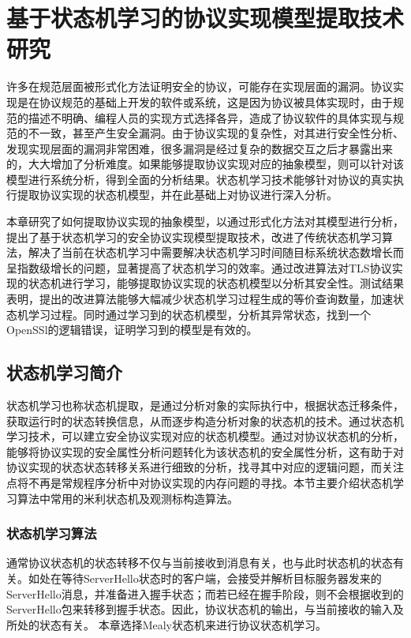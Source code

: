 \chapter{基于状态机学习的协议实现模型提取技术研究}
\label{chap-statemachine}
许多在规范层面被形式化方法证明安全的协议，可能存在实现层面的漏洞。协议实现是在协议规范的基础上开发的软件或系统，这是因为协议被具体实现时，由于规范的描述不明确、编程人员的实现方式选择各异，造成了协议软件的具体实现与规范的不一致，甚至产生安全漏洞。由于协议实现的复杂性，对其进行安全性分析、发现实现层面的漏洞非常困难，很多漏洞是经过复杂的数据交互之后才暴露出来的，大大增加了分析难度。如果能够提取协议实现对应的抽象模型，则可以针对该模型进行系统分析，得到全面的分析结果。状态机学习技术能够针对协议的真实执行提取协议实现的状态机模型，并在此基础上对协议进行深入分析。

本章研究了如何提取协议实现的抽象模型，以通过形式化方法对其模型进行分析，提出了基于状态机学习的安全协议实现模型提取技术，改进了传统状态机学习算法，解决了当前在状态机学习中需要解决状态机学习时间随目标系统状态数增长而呈指数级增长的问题，显著提高了状态机学习的效率。通过改进算法对TLS协议实现的状态机进行学习，能够提取协议实现的状态机模型以分析其安全性。测试结果表明，提出的改进算法能够大幅减少状态机学习过程生成的等价查询数量，加速状态机学习过程。同时通过学习到的状态机模型，分析其异常状态，找到一个OpenSSl的逻辑错误，证明学习到的模型是有效的。


\section{状态机学习简介}

状态机学习也称状态机提取，是通过分析对象的实际执行中，根据状态迁移条件，获取运行时的状态转换信息，从而逐步构造分析对象的状态机的技术。通过状态机学习技术，可以建立安全协议实现对应的状态机模型。通过对协议状态机的分析，能够将协议实现的安全属性分析问题转化为该状态机的安全属性分析，这有助于对协议实现的状态状态转移关系进行细致的分析，找寻其中对应的逻辑问题，而关注点将不再是常规程序分析中对协议实现的内存问题的寻找。本节主要介绍状态机学习算法中常用的米利状态机及观测标构造算法。

\subsection{状态机学习算法}


通常协议状态机的状态转移不仅与当前接收到消息有关，也与此时状态机的状态有关。如处在等待ServerHello状态时的客户端，会接受并解析目标服务器发来的ServerHello消息，并准备进入握手状态；而若已经在握手阶段，则不会根据收到的ServerHello包来转移到握手状态。因此，协议状态机的输出，与当前接收的输入及所处的状态有关。
本章选择Mealy状态机来进行协议状态机学习。



